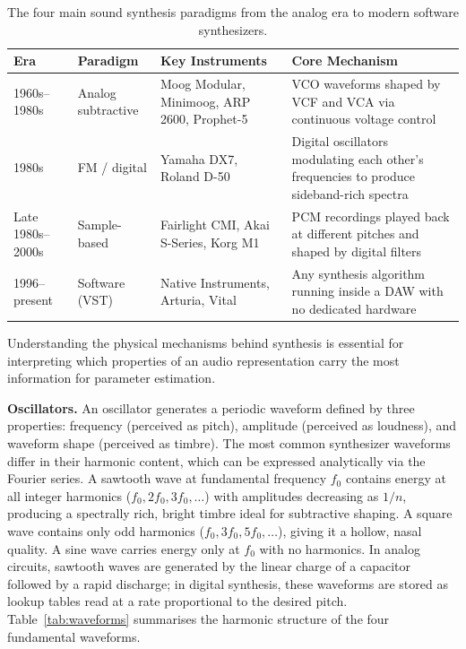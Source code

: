 \begin{table}[H]
\centering
\renewcommand{\arraystretch}{1.4}
\begin{tabular}{p{2.6cm} p{2.8cm} p{4.2cm} p{4.0cm}}
\hline
\textbf{Era} & \textbf{Paradigm} & \textbf{Key Instruments} & \textbf{Core Mechanism} \\
\hline
1960s--1980s & Analog subtractive & Moog Modular, Minimoog, ARP 2600, Prophet-5 & VCO waveforms shaped by VCF and VCA via continuous voltage control \\
1980s & FM / digital & Yamaha DX7, Roland D-50 & Digital oscillators modulating each other's frequencies to produce sideband-rich spectra \\
Late 1980s--2000s & Sample-based & Fairlight CMI, Akai S-Series, Korg M1 & PCM recordings played back at different pitches and shaped by digital filters \\
1996--present & Software (VST) & Native Instruments, Arturia, Vital & Any synthesis algorithm running inside a DAW with no dedicated hardware \\
\hline
\end{tabular}
\vspace{0.3cm}
\caption{The four main sound synthesis paradigms from the analog era to modern software synthesizers.}
\label{tab:synthesis_paradigms}
\end{table}


Understanding the physical mechanisms behind synthesis is essential for interpreting which properties of an audio representation carry the most information for parameter estimation.

\par \vspace{0.3cm}

\noindent \textbf{Oscillators.} An oscillator generates a periodic waveform defined by three properties: frequency (perceived as pitch), amplitude (perceived as loudness), and waveform shape (perceived as timbre). The most common synthesizer waveforms differ in their harmonic content, which can be expressed analytically via the Fourier series. A sawtooth wave at fundamental frequency $f_0$ contains energy at all integer harmonics ($f_0, 2f_0, 3f_0, \ldots$) with amplitudes decreasing as $1/n$, producing a spectrally rich, bright timbre ideal for subtractive shaping. A square wave contains only odd harmonics ($f_0, 3f_0, 5f_0, \ldots$), giving it a hollow, nasal quality. A sine wave carries energy only at $f_0$ with no harmonics. In analog circuits, sawtooth waves are generated by the linear charge of a capacitor followed by a rapid discharge; in digital synthesis, these waveforms are stored as lookup tables read at a rate proportional to the desired pitch. Table~\ref{tab:waveforms} summarises the harmonic structure of the four fundamental waveforms.

